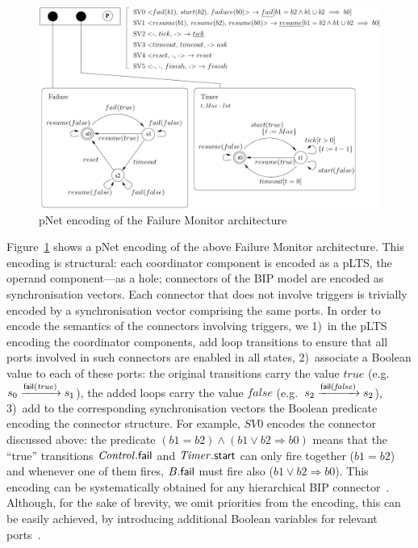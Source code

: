\documentclass{lncs/llncs}
\newcommand{\mdash}{---}
\newcommand{\eg}[1][\ ]{e.g.#1}
\newcommand{\goesto}[2][]{\ensuremath{\xrightarrow[#1]{#2}}}
\newcommand{\true}{\ensuremath{\mathit{true}}}
\newcommand{\false}{\ensuremath{\mathit{false}}}
\begin{document}
\begin{figure}[t]
  \centering
  \includegraphics[width=0.9\columnwidth]{XFIG/FailureTimerPNET}
  \caption{pNet encoding of the Failure Monitor architecture}
  \label{schema:ArchFailure:pNet}
\end{figure}

Figure~\ref{schema:ArchFailure:pNet} shows a pNet encoding of the
above Failure Monitor architecture.  This encoding is structural: each
coordinator component is encoded as a pLTS, the operand
component\mdash as a hole; connectors of the BIP model are encoded as
synchronisation vectors.  Each connector that does not involve
triggers is trivially encoded by a synchronisation vector comprising
the same ports.  In order to encode the semantics of the connectors
involving triggers, we 1)~in the pLTS encoding the coordinator
components, add loop transitions to ensure that all ports involved in
such connectors are enabled in all states, 2)~associate a Boolean
value to each of these ports: the original transitions carry the value
$\true$ (\eg $\cstate{0} \goesto{\PortFail(\true)} \cstate{1}$), the
added loops carry the value $\false$ (\eg $\cstate{2}
\goesto{\PortFail(\false)} \cstate{2}$), 3)~add to the corresponding
synchronisation vectors the Boolean predicate encoding the connector
structure.  For example, $SV0$ encodes the connector discussed above:
the predicate $(b1=b2) \land (b1\lor b2 \Rightarrow b0)$ means that the
``true'' transitions $\mathit{Control}.\mathsf{fail}$ and $\mathit{Timer}.\mathsf{start}$
can only fire together ($b1 = b2$) and whenever one of them fires,
$B.\mathsf{fail}$ must fire also ($b1 \lor b2 \Rightarrow b0$).
This encoding can be systematically obtained for any hierarchical BIP
connector~\cite{BliSif10-causal-fmsd}.
%
Although, for the sake of brevity, we omit priorities from the
encoding, this can be easily achieved, by introducing additional
Boolean variables for relevant ports~\cite{BarBliu15-offer-scico}.
\end{document}
